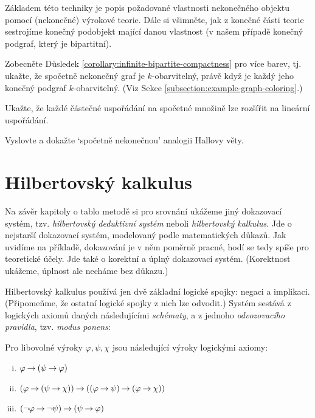 Základem této techniky je popis požadované vlastnosti nekonečného objektu pomocí (nekonečné) výrokové teorie. Dále si všimněte, jak z konečné části teorie sestrojíme konečný podobjekt mající danou vlastnost (v našem případě konečný podgraf, který je bipartitní).

\begin{exercise}
    Zobecněte Důsledek \ref{corollary:infinite-bipartite-compactness} pro více barev, tj. ukažte, že spočetně nekonečný graf je $k$-obarvitelný, právě když je každý jeho konečný podgraf $k$-obarvitelný. (Viz Sekce \ref{subsection:example-graph-coloring}.)
\end{exercise}

\begin{exercise}
    Ukažte, že každé částečné uspořádání na spočetné množině lze rozšířit na lineární uspořádání.
\end{exercise}

\begin{exercise}
    Vyslovte a dokažte `spočetně nekonečnou' analogii Hallovy věty.
\end{exercise}

\section{Hilbertovský kalkulus}\label{section:hilbert-calculus-propositional}

Na závěr kapitoly o tablo metodě si pro srovnání ukážeme jiný dokazovací systém, tzv. \emph{hilbertovský deduktivní systém} neboli \emph{hilbertovský kalkulus}. Jde o nejstarší dokazovací systém, modelovaný podle matematických důkazů. Jak uvidíme na příkladě, dokazování je v něm poměrně pracné, hodí se tedy spíše pro teoretické účely. Jde také o korektní a úplný dokazovací systém. (Korektnost ukážeme, úplnost ale necháme bez důkazu.)

Hilbertovský kalkulus používá jen dvě základní logické spojky: negaci a implikaci. (Připomeňme, že ostatní logické spojky z nich lze odvodit.) Systém sestává z logických axiomů daných následujícími \emph{schématy}, a z jednoho \emph{odvozovacího pravidla}, tzv. \emph{modus ponens}:

\begin{definition}
Pro libovolné výroky $\varphi,\psi,\chi$ jsou následující výroky logickými axiomy:
\begin{enumerate}[(i)]
    \item $\varphi \mathbin{\rightarrow} (\psi \mathbin{\rightarrow} \varphi)$
    \item $(\varphi\mathbin{\rightarrow} (\psi \mathbin{\rightarrow} \chi))\mathbin{\rightarrow} ((\varphi \mathbin{\rightarrow} \psi)\mathbin{\rightarrow}(\varphi \mathbin{\rightarrow} \chi))$
    \item $(\neg \varphi \mathbin{\rightarrow} \neg \psi)\mathbin{\rightarrow}(\psi \mathbin{\rightarrow} \varphi)$
\end{enumerate}
\end{definition}

